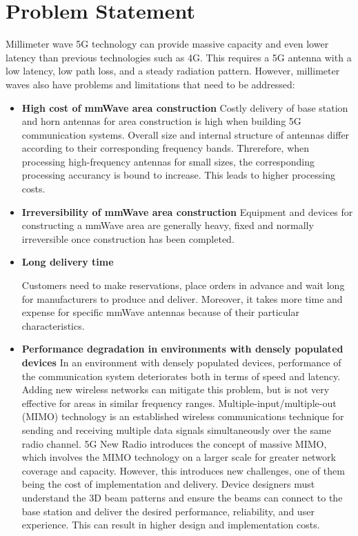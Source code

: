 \documentclass[a4paper,12pt]{report}
\begin{document}

\section{Problem Statement}

Millimeter wave 5G technology can provide massive capacity
and even lower latency than previous technologies such as 4G.
This requires a 5G antenna with a low latency,
low path loss, and a steady radiation pattern.
However, millimeter waves also have problems and limitations
that need to be addressed:

\begin{itemize}
  \item[] \textbf{High cost of mmWave area construction}
  Costly delivery of base station and horn antennas for area construction
  is high when building 5G communication systems.
  Overall size and internal structure of antennas differ according
  to their corresponding frequency bands.
  Threrefore, when processing high-frequency antennas for small sizes,
  the corresponding processing accurancy is bound to increase.
  This leads to higher processing costs.

  \item[] \textbf{Irreversibility of mmWave area construction}
  Equipment and devices for constructing a mmWave area are generally heavy,
  fixed and normally irreversible once construction has been completed.

  \item[] \textbf{Long delivery time}

  Customers need to make reservations, place orders
  in advance and wait long for manufacturers to produce and deliver.
  Moreover, it takes more time and expense for specific mmWave antennas
  because of their particular characteristics.

  \item[] \textbf{Performance degradation in environments with densely populated devices}
  In an environment with densely populated devices,
  performance of the communication system deteriorates
  both in terms of speed and latency.
  Adding new wireless networks can mitigate this problem,
  but is not very effective for areas in similar frequency ranges.
  Multiple-input/multiple-out (MIMO) technology is
  an established wireless communications technique
  for sending and receiving multiple data signals
  simultaneously over the same radio channel.
  5G New Radio introduces the concept of massive MIMO,
  which involves the MIMO technology on a larger scale for
  greater network coverage and capacity.
  However, this introduces new challenges,
  one of them being the cost of implementation and delivery.
  Device designers must understand the 3D beam patterns and
  ensure the beams can connect to the base station
  and deliver the desired performance,
  reliability, and user experience.
  This can result in higher design and implementation costs.
\end{itemize}
\end{document}
